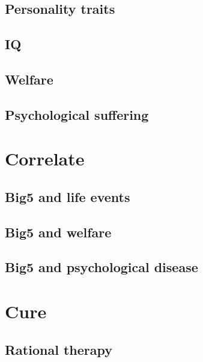 \documentclass[]{book}
\begin{document}
\hypertarget{personality-traits}{%
\section{Personality traits}\label{personality-traits}}

\hypertarget{iq}{%
\section{IQ}\label{iq}}

\hypertarget{welfare}{%
\section{Welfare}\label{welfare}}

\hypertarget{psychological-suffering}{%
\section{Psychological suffering}\label{psychological-suffering}}

\hypertarget{correlate}{%
\chapter{Correlate}\label{correlate}}

\hypertarget{big5-and-life-events}{%
\section{Big5 and life events}\label{big5-and-life-events}}

\hypertarget{big5-and-welfare}{%
\section{Big5 and welfare}\label{big5-and-welfare}}

\hypertarget{big5-and-psychological-disease}{%
\section{Big5 and psychological disease}\label{big5-and-psychological-disease}}

\hypertarget{cure}{%
\chapter{Cure}\label{cure}}

\hypertarget{rational-therapy}{%
\section{Rational therapy}\label{rational-therapy}}
\end{document}
